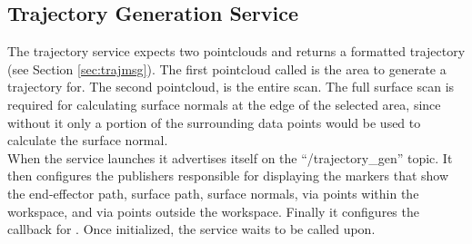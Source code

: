 \subsection{Trajectory Generation  Service}
The trajectory service expects two pointclouds and returns a  formatted trajectory (see Section \ref{sec:trajmsg}). The first pointcloud called  is the area to generate a trajectory for. The second pointcloud,  is the entire scan. The full surface scan is required for calculating surface normals at the edge of the selected area, since without it only a portion of the surrounding data points would be used to calculate the surface normal.\\

When the service launches it advertises itself on the ``/trajectory\_gen'' topic. It then configures the publishers responsible for displaying the markers that show the end-effector path, surface path, surface normals, via points within the workspace, and via points outside the workspace. Finally it configures the callback for . Once initialized, the service waits to be called upon.\\

